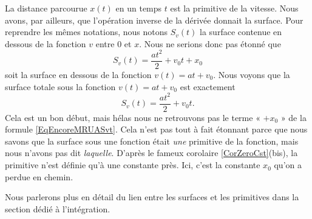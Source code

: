 La distance parcourue $x(t)$ en un temps $t$ est la primitive de la vitesse. Nous avons, par ailleurs, que l'opération inverse de la dérivée donnait la surface. Pour reprendre les mêmes notations, nous notons $S_v(t)$ la surface contenue en dessous de la fonction $v$ entre $0$ et $x$. Nous ne serions donc pas étonné que
\begin{equation}        \label{EqEncoreMRUASvt}
	S_v(t) = \frac{ at^2 }{ 2 }+v_0t+x_0
\end{equation}
soit la surface en dessous de la fonction $v(t)=at+v_0$. Nous voyons que la surface totale sous la fonction $v(t)=at+v_0$ est exactement
\begin{equation}
	S_v(t)=\frac{ at^2 }{ 2 }+v_0t.
\end{equation}
Cela est un bon début, mais hélas nous ne retrouvons pas le terme « $+x_0$ » de la formule \eqref{EqEncoreMRUASvt}. Cela n'est pas tout à fait étonnant parce que nous savons que la surface sous une fonction était \emph{une} primitive de la fonction, mais nous n'avons pas dit \emph{laquelle}. D'après le fameux corolaire \ref{CorZeroCst}(bis), la primitive n'est définie qu'à une constante près. Ici, c'est la constante $x_0$ qu'on a perdue en chemin.

Nous parlerons plus en détail du lien entre les surfaces et les primitives dans la section dédié à l'intégration.
